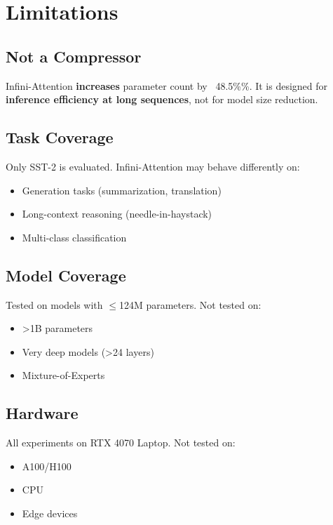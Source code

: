 
\section{Limitations}

\subsection{Not a Compressor}

Infini-Attention \textbf{increases} parameter count by ~48.5\%\%. It is 
designed for \textbf{inference efficiency at long sequences}, not for model 
size reduction.

\subsection{Task Coverage}

Only SST-2 is evaluated. Infini-Attention may behave differently on:

\begin{itemize}
\item Generation tasks (summarization, translation)
\item Long-context reasoning (needle-in-haystack)
\item Multi-class classification

\end{itemize}
\subsection{Model Coverage}

Tested on models with $\le$124M parameters. Not tested on:

\begin{itemize}
\item >1B parameters
\item Very deep models (>24 layers)
\item Mixture-of-Experts

\end{itemize}
\subsection{Hardware}

All experiments on RTX 4070 Laptop. Not tested on:

\begin{itemize}
\item A100/H100
\item CPU
\item Edge devices

\end{itemize}
